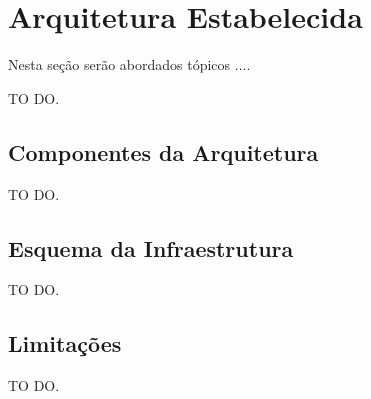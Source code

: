 \chapter{Arquitetura Estabelecida}
\label{chap:Arquitetura}
	
	Nesta seção serão abordados tópicos ....

	TO DO.

	\section{Componentes da Arquitetura}
	\label{sec:Arquitetura_Componentes}

		TO DO.

	\section{Esquema da Infraestrutura}
	\label{sec:Arquitetura_Esquema_Infra}

		TO DO.

	\section{Limitações}
	\label{sec:Arquitetura_Limitacoes}

		TO DO.

		